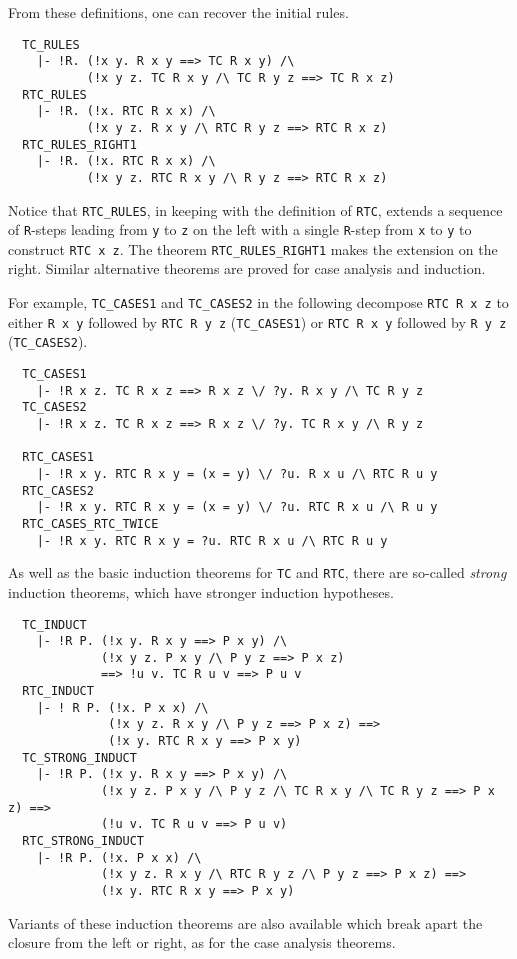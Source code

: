 From these definitions, one can recover the initial rules.
%
\begin{hol}
{\small
\begin{verbatim}
  TC_RULES
    |- !R. (!x y. R x y ==> TC R x y) /\
           (!x y z. TC R x y /\ TC R y z ==> TC R x z)
  RTC_RULES
    |- !R. (!x. RTC R x x) /\
           (!x y z. R x y /\ RTC R y z ==> RTC R x z)
  RTC_RULES_RIGHT1
    |- !R. (!x. RTC R x x) /\
           (!x y z. RTC R x y /\ R y z ==> RTC R x z)
\end{verbatim}
}
\end{hol}
%
Notice that {\small\verb+RTC_RULES+}, in keeping with the definition
of {\small\verb+RTC+}, extends a sequence of \verb+R+-steps leading
from \verb+y+ to \verb+z+ on the left with a single \verb+R+-step from
\verb+x+ to \verb+y+ to construct \verb+RTC x z+. The theorem
{\small\verb+RTC_RULES_RIGHT1+} makes the extension on the right.
Similar alternative theorems are proved for case analysis and induction.

For example, {\small\verb+TC_CASES1+} and {\small\verb+TC_CASES2+} in the
following decompose {\small\verb+RTC R x z+} to either
{\small\verb+R x y+} followed by {\small\verb+RTC R y z+}
({\small\verb+TC_CASES1+})
or
{\small\verb+RTC R x y+} followed by {\small\verb+R y z+}
({\small\verb+TC_CASES2+}).

%
\begin{hol}
{\small
\begin{verbatim}
  TC_CASES1
    |- !R x z. TC R x z ==> R x z \/ ?y. R x y /\ TC R y z
  TC_CASES2
    |- !R x z. TC R x z ==> R x z \/ ?y. TC R x y /\ R y z

  RTC_CASES1
    |- !R x y. RTC R x y = (x = y) \/ ?u. R x u /\ RTC R u y
  RTC_CASES2
    |- !R x y. RTC R x y = (x = y) \/ ?u. RTC R x u /\ R u y
  RTC_CASES_RTC_TWICE
    |- !R x y. RTC R x y = ?u. RTC R x u /\ RTC R u y
\end{verbatim}
}
\end{hol}

As well as the basic induction theorems for {\small\verb+TC+} and
{\small\verb+RTC+}, there are so-called \emph{strong} induction
theorems, which have stronger induction hypotheses.
%
\begin{hol}
{\small
\begin{verbatim}
  TC_INDUCT
    |- !R P. (!x y. R x y ==> P x y) /\
             (!x y z. P x y /\ P y z ==> P x z)
             ==> !u v. TC R u v ==> P u v
  RTC_INDUCT
    |- ! R P. (!x. P x x) /\
              (!x y z. R x y /\ P y z ==> P x z) ==>
              (!x y. RTC R x y ==> P x y)
  TC_STRONG_INDUCT
    |- !R P. (!x y. R x y ==> P x y) /\
             (!x y z. P x y /\ P y z /\ TC R x y /\ TC R y z ==> P x z) ==>
             (!u v. TC R u v ==> P u v)
  RTC_STRONG_INDUCT
    |- !R P. (!x. P x x) /\
             (!x y z. R x y /\ RTC R y z /\ P y z ==> P x z) ==>
             (!x y. RTC R x y ==> P x y)
\end{verbatim}
}
\end{hol}
Variants of these induction theorems are also available which break
apart the closure from the left or right, as for the case analysis theorems.

